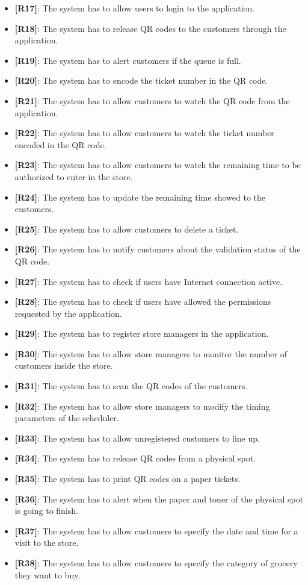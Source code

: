 \begin{itemize}
    \item {\textbf{[R17]}}: The system has to allow users to login to the application.
    \item {\textbf{[R18]}}: The system has to release QR codes to the customers through the application.
    \item {\textbf{[R19]}}: The system has to alert customers if the queue is full.
    \item {\textbf{[R20]}}: The system has to encode the ticket number in the QR code.
    \item {\textbf{[R21]}}: The system has to allow customers to watch the QR code from the application.
    \item {\textbf{[R22]}}: The system has to allow customers to watch the ticket number encoded in the QR code.
    \item {\textbf{[R23]}}: The system has to allow customers to watch the remaining time to be authorized to enter in the store.
    \item {\textbf{[R24]}}: The system has to update the remaining time showed to the customers.
    \item {\textbf{[R25]}}: The system has to allow customers to delete a ticket.
    \item {\textbf{[R26]}}: The system has to notify customers about the validation status of the QR code.
    \item {\textbf{[R27]}}: The system has to check if users have Internet connection active.
    \item {\textbf{[R28]}}: The system has to check if users have allowed the permissions requested by the application.
    \item {\textbf{[R29]}}: The system has to register store managers in the application.
    \item {\textbf{[R30]}}: The system has to allow store managers to monitor the number of customers inside the store.
    \item {\textbf{[R31]}}: The system has to scan the QR codes of the customers.
    \item {\textbf{[R32]}}: The system has to allow store managers to modify the timing parameters of the scheduler.
    \item {\textbf{[R33]}}: The system has to allow unregistered customers to line up.
    \item {\textbf{[R34]}}: The system has to release QR codes from a physical spot.
    \item {\textbf{[R35]}}: The system has to print QR codes on a paper tickets.
    \item {\textbf{[R36]}}: The system has to alert when the paper and toner of the physical spot is going to finish.
    \item {\textbf{[R37]}}: The system has to allow customers to specify the date and time for a visit to the store.
    \item {\textbf{[R38]}}: The system has to allow customers to specify the category of grocery they want to buy.

\end{itemize}

